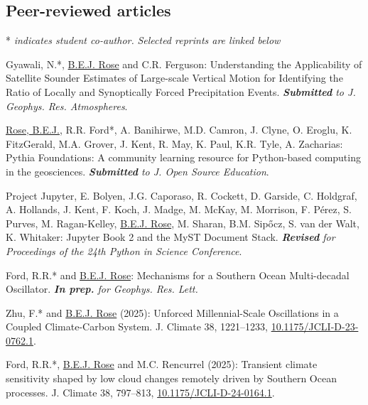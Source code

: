 \documentclass[11pt, letterpaper]{article} %
\newcommand{\years}[1]{\marginnote{\scriptsize #1}} %
\begin{document}
\subsection*{Peer-reviewed articles}
* \emph{indicates student co-author.} \emph{Selected reprints are linked below}

\years{2025}

Gyawali, N.*, \underline{B.E.J. Rose} and C.R. Ferguson: Understanding the Applicability of Satellite Sounder Estimates of Large-scale Vertical Motion for Identifying the Ratio of Locally and Synoptically Forced Precipitation Events. \emph{\textbf{Submitted} to J. Geophys. Res. Atmospheres}.
\vspace{0.2 cm}

\underline{Rose, B.E.J.}, R.R. Ford*, A. Banihirwe, M.D. Camron, J. Clyne, O. Eroglu, K. FitzGerald, M.A. Grover, J. Kent, R. May, K. Paul, K.R. Tyle, A. Zacharias: Pythia Foundations: A community learning resource for Python-based computing in the geosciences. \emph{\textbf{Submitted} to J. Open Source Education}.
\vspace{0.2 cm}

Project Jupyter, E. Bolyen, J.G. Caporaso, R. Cockett, D. Garside, C. Holdgraf, A. Hollands, J. Kent, F. Koch, J. Madge, M. McKay, M. Morrison, F. Pérez, S. Purves, M. Ragan-Kelley, \underline{B.E.J. Rose}, M. Sharan, B.M. Sipőcz, S. van der Walt, K. Whitaker: Jupyter Book 2 and the MyST Document Stack. \emph{\textbf{Revised} for Proceedings of the 24th
Python in Science Conference}.
\vspace{0.2 cm}

Ford, R.R.* and \underline{B.E.J. Rose}: Mechanisms for a Southern Ocean Multi-decadal Oscillator. \emph{\textbf{In prep.} for Geophys. Res. Lett.}
\vspace{0.2 cm}

Zhu, F.* and \underline{B.E.J. Rose} (2025): Unforced Millennial-Scale Oscillations in a Coupled Climate-Carbon System. J. Climate 38, 1221--1233, \href{https://doi.org/10.1175/JCLI-D-23-0762.1}{10.1175/JCLI-D-23-0762.1}.
\vspace{0.2 cm}

Ford, R.R.*, \underline{B.E.J. Rose} and M.C. Rencurrel (2025): Transient climate sensitivity shaped by low cloud changes remotely driven by Southern Ocean processes. J. Climate 38, 797--813, \href{https://doi.org/10.1175/JCLI-D-24-0164.1}{10.1175/JCLI-D-24-0164.1}.
\vspace{0.2 cm}
\end{document}
